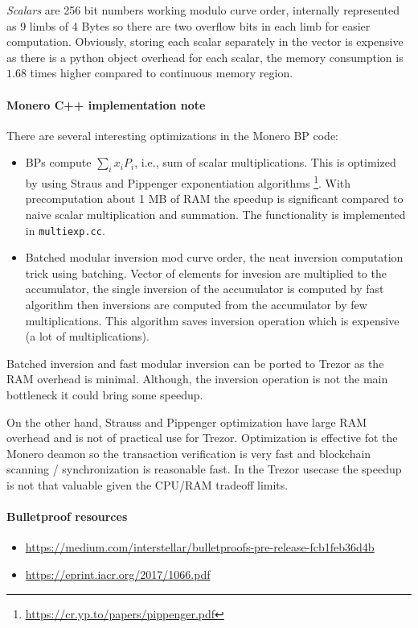 \documentclass[]{article}
\begin{document}
\emph{Scalars} are 256 bit numbers working modulo curve order, internally represented as 9 limbs of 4 Bytes so there are two overflow bits in each limb for easier computation. Obviously, storing each scalar separately in the vector is expensive as there is a python object overhead for each scalar, the memory consumption is $1.68$ times higher compared to continuous memory region.

\paragraph{Monero C++ implementation note} There are several interesting optimizations in the Monero BP code:
\begin{itemize}
	\item BPs compute $\sum_{i} x_iP_i$, i.e., sum of scalar multiplications. This is optimized by using Straus and Pippenger exponentiation algorithms \footnote{\url{https://cr.yp.to/papers/pippenger.pdf}}. With precomputation about 1 MB of RAM the speedup is significant compared to naive scalar multiplication and summation. The functionality is implemented in \verb|multiexp.cc|. 
	
	\item Batched modular inversion mod curve order, the neat inversion computation trick using batching. Vector of elements for invesion are multiplied to the accumulator, the single inversion of the accumulator is computed by fast algorithm then inversions are computed from the accumulator by few multiplications. This algorithm saves inversion operation which is expensive (a lot of multiplications). 
\end{itemize}

Batched inversion and fast modular inversion can be ported to Trezor as the RAM overhead is minimal. Although, the inversion operation is not the main bottleneck it could bring some speedup.

On the other hand, Strauss and Pippenger optimization have large RAM overhead and is not of practical use for Trezor. Optimization is effective fot the Monero deamon so the transaction verification is very fast and blockchain scanning / synchronization is reasonable fast. In the Trezor usecase the speedup is not that valuable given the CPU/RAM tradeoff limits.

\paragraph{Bulletproof resources}
\begin{itemize}
	\item \url{https://medium.com/interstellar/bulletproofs-pre-release-fcb1feb36d4b}
	\item {} \url{https://eprint.iacr.org/2017/1066.pdf}
\end{itemize}
\end{document}
